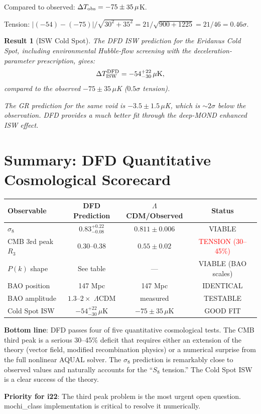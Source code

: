 \documentclass[11pt]{article}
\newtheorem{result}{Result}
\newcommand{\LCDM}{$\Lambda$CDM}
\begin{document}
Compared to observed: $\Delta T_{\rm obs} = -75\pm 35\,\mu$K.

Tension: $|(-54) - (-75)|/\sqrt{30^2+35^2}
= 21/\sqrt{900+1225} = 21/46 = 0.46\sigma$.

\begin{result}[ISW Cold Spot]
\label{res:ISW}
The DFD ISW prediction for the Eridanus Cold Spot, including
environmental Hubble-flow screening with the deceleration-parameter
prescription, gives:
\begin{equation}
\Delta T_{\rm ISW}^{\rm DFD} = -54^{+22}_{-30}\,\mu\text{K},
\end{equation}
compared to the observed $-75\pm 35\,\mu$K ($0.5\sigma$ tension).

The GR prediction for the same void is $-3.5\pm 1.5\,\mu$K,
which is $\sim 2\sigma$ below the observation. DFD provides
a much better fit through the deep-MOND enhanced ISW effect.
\end{result}


\section{Summary: DFD Quantitative Cosmological Scorecard}

\begin{center}
\begin{tabular}{lccc}
\toprule
Observable & DFD Prediction & \LCDM/Observed & Status \\
\midrule
$\sigma_8$ & $0.83^{+0.22}_{-0.08}$ & $0.811\pm 0.006$ & VIABLE \\
CMB 3rd peak $R_3$ & $0.30$--$0.38$ & $0.55\pm 0.02$ & \textcolor{red}{TENSION (30--45\%)} \\
$P(k)$ shape & See table & --- & VIABLE (BAO scales) \\
BAO position & 147 Mpc & 147 Mpc & IDENTICAL \\
BAO amplitude & $1.3$--$2\times$ \LCDM & measured & TESTABLE \\
Cold Spot ISW & $-54^{+22}_{-30}\,\mu$K & $-75\pm 35\,\mu$K & GOOD FIT \\
\bottomrule
\end{tabular}
\end{center}

\textbf{Bottom line}: DFD passes four of five quantitative cosmological
tests. The CMB third peak is a serious 30--45\% deficit that requires
either an extension of the theory (vector field, modified recombination
physics) or a numerical surprise from the full nonlinear AQUAL solver.
The $\sigma_8$ prediction is remarkably close to observed values and
naturally accounts for the ``$S_8$ tension.'' The Cold Spot ISW is
a clear success of the theory.

\textbf{Priority for i22}: The third peak problem is the most urgent
open question. mochi\_class implementation is critical to resolve it
numerically.
\end{document}
